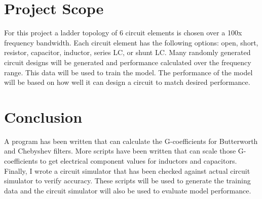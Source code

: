 \documentclass[10pt,conference]{IEEEtran}
\begin{document}
\section{Project Scope}


For this project a ladder topology of 6 circuit elements is chosen over a 100x frequency bandwidth. Each circuit element has the following options: open, short, resistor, capacitor, inductor, series LC, or shunt LC. Many randomly generated circuit designs will be generated and performance calculated over the frequency range. This data will be used to train the model. The performance of the model will be based on how well it can design a circuit to match desired performance.











\section{Conclusion}
A program has been written that can calculate the G-coefficients for Butterworth and Chebyshev filters. More scripts have been written that can scale those G-coefficients to get electrical component values for inductors and capacitors. Finally, I wrote a circuit simulator that has been checked against actual circuit simulator to verify accuracy. These scripts will be used to generate the training data and the circuit simulator will also be used to evaluate model performance.










\end{document}
